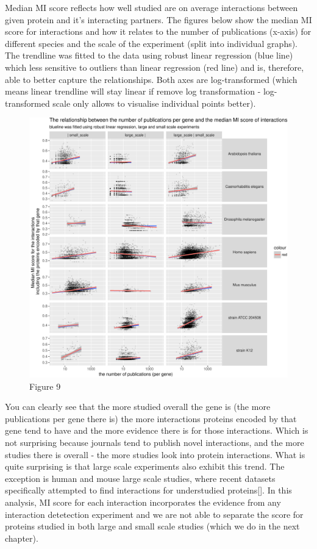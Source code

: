 \documentclass[]{article}
\begin{document}
Median MI score reflects how well studied are on average interactions
between given protein and it's interacting partners. The figures below
show the median MI score for interactions and how it relates to the
number of publications (x-axis) for different species and the scale of
the experiment (split into individual graphs). The trendline was fitted
to the data using robust linear regression (blue line) which less
sensitive to outliers than linear regression (red line) and is,
therefore, able to better capture the relationships. Both axes are
log-transformed (which means linear trendline will stay linear if remove
log transformation - log-transformed scale only allows to visualise
individual points better).

\begin{figure}[htbp]
\centering
\includegraphics{final_report_files/figure-latex/publications_vs_MI_score-1.pdf}
\caption{Figure 9}
\end{figure}

You can clearly see that the more studied overall the gene is (the more
publications per gene there is) the more interactions proteins encoded
by that gene tend to have and the more evidence there is for those
interactions. Which is not surprising because journals tend to publish
novel interactions, and the more studies there is overall - the more
studies look into protein interactions. What is quite surprising is that
large scale experiments also exhibit this trend. The exception is human
and mouse large scale studies, where recent datasets specifically
attempted to find interactions for understudied proteins{[}{]}. In this
analysis, MI score for each interaction incorporates the evidence from
any interaction detetection experiment and we are not able to separate
the score for proteins studied in both large and small scale studies
(which we do in the next chapter).
\end{document}
